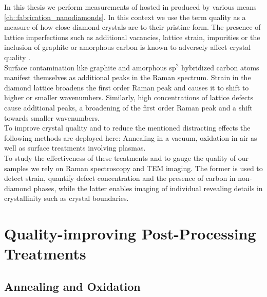 		
		In this thesis we perform measurements of \sivs hosted in \nds produced by various means \cref{ch::fabrication_nanodiamonds}.
		In this context we use the term quality as a measure of how close diamond crystals are to their pristine form. 
		The presence of lattice imperfections such as additional vacancies, lattice strain, impurities or the inclusion of graphite or amorphous carbon is known to adversely affect crystal quality \cite{Zaitsev2001,Prawer2004,Orwa2000}.
		\\
		Surface contamination like graphite and amorphous sp$^2$ hybridized carbon atoms manifest themselves as additional peaks in the Raman spectrum.
		Strain in the diamond lattice broadens the first order Raman peak and causes it to shift to higher or smaller wavenumbers.
		Similarly, high concentrations of lattice defects cause additional peaks, a broadening of the first order Raman peak and a shift towards smaller wavenumbers.
		\\
		To improve crystal quality and to reduce the mentioned distracting effects the following methods are deployed here: Annealing in a vacuum, oxidation in air as well as surface treatments involving plasmas.
		\\
		To study the effectiveness of these treatments and to gauge the quality of our \nd samples we rely on Raman spectroscopy and TEM imaging. The former is used to detect strain, quantify defect concentration and the presence of carbon in non-diamond phases, while the latter enables imaging of individual \nds revealing details in crystallinity such as crystal boundaries.

		\section{Quality-improving Post-Processing Treatments}

			\subsection{Annealing and Oxidation}\label{subsection::ann_ox}

